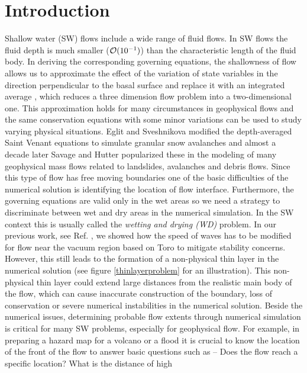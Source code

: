 \documentclass[review]{elsarticle}
\begin{document}
\linenumbers

\section{Introduction} 
\label{introduction}
Shallow water (SW) flows include a wide range of fluid flows. In SW flows the fluid depth is much 
smaller (${\cal O}(10^{-1})$) than the characteristic length of the fluid body. In deriving the corresponding 
governing equations, the shallowness of flow allows us to approximate the effect of the variation of state variables in the direction perpendicular to the basal surface and replace
it with an integrated average \cite{SavageHutter}, which
reduces a three dimension flow problem into a two-dimensional one.
This approximation holds for many circumstances in geophysical flows and the same 
conservation equations with some minor variations can be used to study varying physical situations.
Eglit and Sveshnikova \cite{eglit1980mms} modified the depth-averaged Saint Venant equations to simulate granular snow avalanches and almost a decade later 
Savage and Hutter \cite{SavageHutter} popularized these in the modeling of many geophysical mass flows related to landslides, avalanches and debris flows. 
Since this type of flow has free moving boundaries one of the basic difficulties 
of the numerical solution is identifying the location of flow interface. 
Furthermore, the governing equations are valid only in the wet areas so we need a strategy to discriminate between wet and dry areas in the numerical simulation. 
In the SW context this is usually called the {\it wetting and drying (WD)} problem. %
In our previous work, see Ref. \cite{Patra2005}, we showed how the speed of waves has to be modified for flow near the vacuum region based on Toro \cite{ToroBook2001} to mitigate stability concerns. However, this still leads to the formation of a non-physical thin layer in the numerical solution (see figure \ref{thinlayerproblem} for an illustration).
This non-physical thin layer could extend large distances from the realistic main 
body of the flow, which can cause inaccurate construction of the boundary, loss of conservation or severe 
numerical instabilities in the numerical solution. 
Beside the numerical issues, determining probable flow extents through numerical simulation is critical for many SW problems, especially for geophysical flow. For example, in preparing a hazard map 
for a volcano or a flood it is crucial to know the location of the front of the flow to answer basic questions such as --  Does the flow reach a specific location? What is the distance of high 
\end{document}
